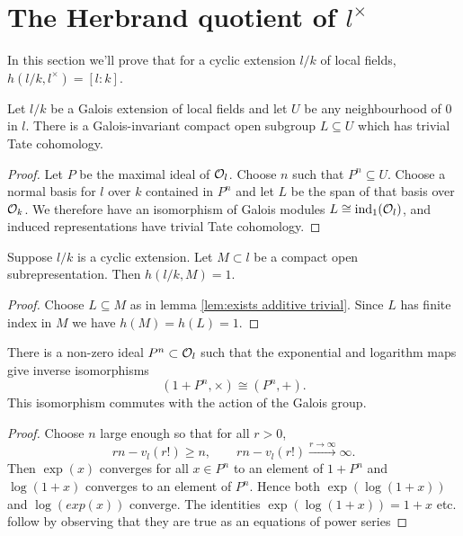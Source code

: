 \section{The Herbrand quotient of \texorpdfstring{$l^{\times}$}{l*}}

In this section we'll prove that for a cyclic extension $l/k$ of local fields,
$h(l/k,l^\times) = [l:k]$.

\begin{lemma}
	\label{lem:exists additive trivial}
	Let $l/k$ be a Galois extension of local fields and
	let $U$ be any neighbourhood of $0$ in $l$.
	There is a Galois-invariant compact open subgroup $L \subseteq U$
	which has trivial Tate cohomology.
\end{lemma}

\begin{proof}
	Let $P$ be the maximal ideal of ${\mathcal O}_l$.
	Choose $n$ such that $P^n \subseteq U$.
	Choose a normal basis for $l$ over $k$ contained in $P^n$
	and let $L$ be the span of that basis over ${\mathcal O}_k$.
	We therefore have an isomorphism of Galois modules $L \cong \mathrm{ind}_1({\mathcal O}_l)$,
	and induced representations have trivial Tate cohomology.
\end{proof}

\begin{lemma} \label{lem:herbrand compact open additive}
	Suppose $l/k$ is a cyclic extension.
	Let $M \subset l$ be a compact open subrepresentation.
	Then $h(l/k,M)=1$.
\end{lemma}

\begin{proof}
	Choose $L \subseteq M$ as in lemma \ref{lem:exists additive trivial}.
	Since $L$ has finite index in $M$ we have $h(M) = h(L) = 1$.
\end{proof}


\begin{lemma}\label{lem:local isomorphism}
	There is a non-zero ideal $P^n \subset {\mathcal O}_l$ such that the
	exponential and logarithm maps give inverse isomorphisms
	\[
		(1 + P^n, \times) \cong (P^n,+).
	\]
	This isomorphism commutes with the action of the Galois group.
\end{lemma}

\begin{proof}
	Choose $n$ large enough so that for all $r > 0$,
	\[
		rn - v_l(r!) \ge n, \qquad
		rn - v_l(r!) \stackrel{r \to \infty}\to \infty.
	\]
	Then $\exp(x)$ converges for all $x \in P^n$ to an element of $1 + P^n$ and
	$\log(1+x)$ converges to an element of $P^n$.
	Hence both $\exp(\log(1+x))$ and $\log(exp(x))$ converge.
	The identities $\exp(\log(1+x))=1+x$ etc. follow by observing that they are true as
	an equations of power series
\end{proof}


